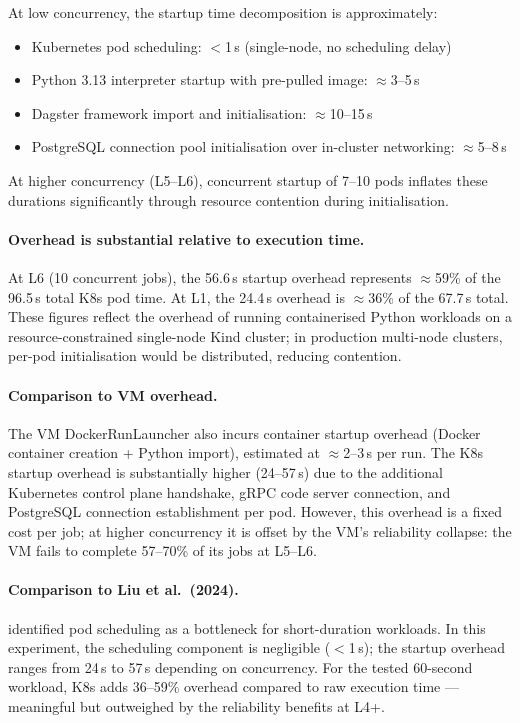 At low concurrency, the startup time decomposition is approximately:
\begin{itemize}
  \item Kubernetes pod scheduling: $<$1\,s (single-node, no scheduling delay)
  \item Python 3.13 interpreter startup with pre-pulled image: $\approx$3--5\,s
  \item Dagster framework import and initialisation: $\approx$10--15\,s
  \item PostgreSQL connection pool initialisation over in-cluster networking: $\approx$5--8\,s
\end{itemize}
At higher concurrency (L5--L6), concurrent startup of 7--10 pods inflates these durations significantly through resource contention during initialisation.

\paragraph{Overhead is substantial relative to execution time.}
At L6 (10 concurrent jobs), the 56.6\,s startup overhead represents $\approx$59\% of the 96.5\,s total K8s pod time.
At L1, the 24.4\,s overhead is $\approx$36\% of the 67.7\,s total.
These figures reflect the overhead of running containerised Python workloads on a resource-constrained single-node Kind cluster; in production multi-node clusters, per-pod initialisation would be distributed, reducing contention.

\paragraph{Comparison to VM overhead.}
The VM DockerRunLauncher also incurs container startup overhead (Docker container creation + Python import), estimated at $\approx$2--3\,s per run.
The K8s startup overhead is substantially higher (24--57\,s) due to the additional Kubernetes control plane handshake, gRPC code server connection, and PostgreSQL connection establishment per pod.
However, this overhead is a fixed cost per job; at higher concurrency it is offset by the VM's reliability collapse: the VM fails to complete 57--70\% of its jobs at L5--L6.

\paragraph{Comparison to Liu et al.\ (2024).}
\citet{liu2024} identified pod scheduling as a bottleneck for short-duration workloads.
In this experiment, the scheduling component is negligible ($<$1\,s); the startup overhead ranges from 24\,s to 57\,s depending on concurrency.
For the tested 60-second workload, K8s adds 36--59\% overhead compared to raw execution time --- meaningful but outweighed by the reliability benefits at L4+.


